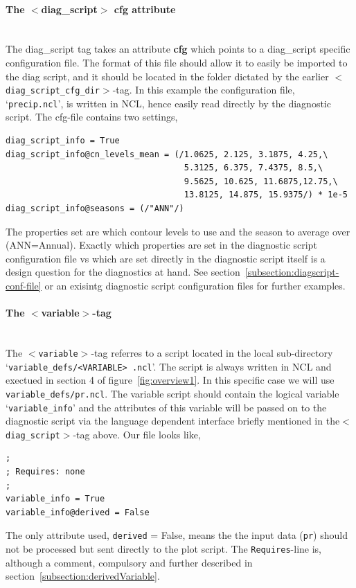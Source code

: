 \documentclass[12pt]{article}
\newcommand{\xmltag}[1]{\texttt{$<$#1$>$}}
\begin{document}
\paragraph{The $<$diag\_script$>$ cfg attribute}
~\\
The diag\_script tag takes an attribute \textbf{cfg} which points to a
diag\_script specific configuration file. The format of this file
should allow it to easily be imported to the diag script, and it
should be located in the folder dictated by the earlier
\xmltag{diag\_script\_cfg\_dir}-tag. In this example the configuration
file, `\texttt{precip.ncl}', is written in NCL, hence easily read
directly by the diagnostic script. The cfg-file contains two settings, 
\begin{Verbatim}[frame=single, fontsize=\footnotesize]
diag_script_info = True
diag_script_info@cn_levels_mean = (/1.0625, 2.125, 3.1875, 4.25,\
                                    5.3125, 6.375, 7.4375, 8.5,\
                                    9.5625, 10.625, 11.6875,12.75,\ 
                                    13.8125, 14.875, 15.9375/) * 1e-5
diag_script_info@seasons = (/"ANN"/)
\end{Verbatim}
The properties set are which  contour levels to use and the season to
average over (ANN=Annual). Exactly which properties are set in the
diagnostic script configuration file vs which are set directly in the
diagnostic script itself is a design question for the diagnostics at
hand. See section~\ref{subsection:diagscript-conf-file} or an exisintg
diagnostic script configuration files for further examples.

\paragraph{The $<$variable$>$-tag}
~\\
The \xmltag{variable}-tag referres to a script located in the local
sub-directory `\texttt{variable\_defs/<VARIABLE> .ncl}'. The script is
always written in NCL and exectued in section 4 of
figure~\ref{fig:overview1}. In this specific case we will use
\texttt{variable\_defs/pr.ncl}. The variable script should contain the
logical variable `\texttt{variable\_info}' and the attributes of this
variable will be passed on to the diagnostic script via the language
dependent interface briefly mentioned in the\xmltag{diag\_script}-tag
above. Our file looks like, 
\begin{Verbatim}[frame=single, fontsize=\footnotesize]
;
; Requires: none
;
variable_info = True
variable_info@derived = False
\end{Verbatim}  
The only attribute used, \texttt{derived} = False, means the the input
data (\texttt{pr}) should not be processed but sent directly to the
plot script. The \texttt{Requires}-line is, although a comment,
compulsory and further described in
section~\ref{subsection:derivedVariable}. 
\end{document}
